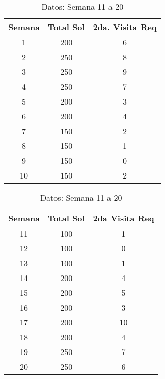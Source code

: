 \documentclass{article}
\begin{document}
\begin{table}[h]
    \centering
    \begin{minipage}{0.45\textwidth}
        \centering
        \begin{tabular}{ccc}
            \toprule
            \textbf{Semana} & \textbf{Total Sol} & \textbf{2da. Visita Req} \\
            \midrule
            1  & 200 & 6 \\
            2  & 250 & 8 \\
            3  & 250 & 9 \\
            4  & 250 & 7 \\
            5  & 200 & 3 \\
            6  & 200 & 4 \\
            7  & 150 & 2 \\
            8  & 150 & 1 \\
            9  & 150 & 0 \\
            10 & 150 & 2 \\
            \bottomrule
        \end{tabular}
        \caption{Datos: Semana 1 a 10}
        \label{tab:datos5_parte1}
    \end{minipage}
    \hfill
    \begin{minipage}{0.45\textwidth}
        \centering
        \begin{tabular}{ccc}
            \toprule
            \textbf{Semana} & \textbf{Total Sol} & \textbf{2da Visita Req} \\
            \midrule
            11 & 100 & 1 \\
            12 & 100 & 0 \\
            13 & 100 & 1 \\
            14 & 200 & 4 \\
            15 & 200 & 5 \\
            16 & 200 & 3 \\
            17 & 200 & 10 \\
            18 & 200 & 4 \\
            19 & 250 & 7 \\
            20 & 250 & 6 \\
            \bottomrule
        \end{tabular}
        \caption{Datos: Semana 11 a 20}
        \label{tab:datos5_parte2}
    \end{minipage}
\end{table}
\end{document}
